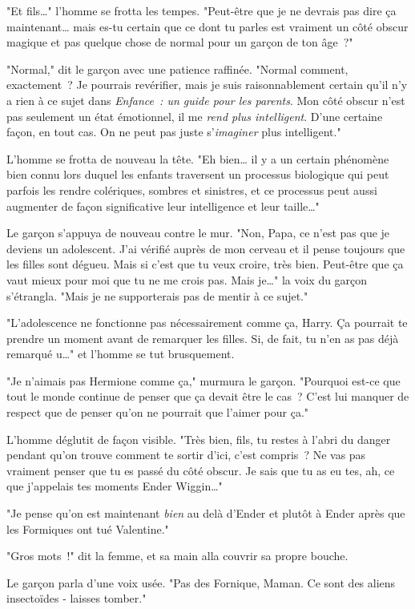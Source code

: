"Et fils…" l'homme se frotta les tempes. "Peut-être que je ne devrais pas dire ça maintenant… mais es-tu certain que ce dont tu parles est vraiment un côté obscur magique et pas quelque chose de normal pour un garçon de ton âge~?"

"Normal," dit le garçon avec une patience raffinée. "Normal comment, exactement~? Je pourrais revérifier, mais je suis raisonnablement certain qu'il n'y a rien à ce sujet dans \emph{Enfance~: un guide pour les parents}. Mon côté obscur n'est pas seulement un état émotionnel, il me \emph{rend plus intelligent}. D'une certaine façon, en tout cas. On ne peut pas juste s'\emph{imaginer} plus intelligent."

L'homme se frotta de nouveau la tête. "Eh bien… il y a un certain phénomène bien connu lors duquel les enfants traversent un processus biologique qui peut parfois les rendre colériques, sombres et sinistres, et ce processus peut aussi augmenter de façon significative leur intelligence et leur taille…"

Le garçon s'appuya de nouveau contre le mur. "Non, Papa, ce n'est pas que je deviens un adolescent. J'ai vérifié auprès de mon cerveau et il pense toujours que les filles sont dégueu. Mais si c'est que tu veux croire, très bien. Peut-être que ça vaut mieux pour moi que tu ne me crois pas. Mais je…" la voix du garçon s'étrangla. "Mais je ne supporterais pas de mentir à ce sujet."

"L'adolescence ne fonctionne pas nécessairement comme ça, Harry. Ça pourrait te prendre un moment avant de remarquer les filles. Si, de fait, tu n'en as pas déjà remarqué u…" et l'homme se tut brusquement.

"Je n'aimais pas Hermione comme ça," murmura le garçon. "Pourquoi est-ce que tout le monde continue de penser que ça devait être le cas~? C'est lui manquer de respect que de penser qu'on ne pourrait que l'aimer pour ça."

L'homme déglutit de façon visible. "Très bien, fils, tu restes à l'abri du danger pendant qu'on trouve comment te sortir d'ici, c'est compris~? Ne vas pas vraiment penser que tu es passé du côté obscur. Je sais que tu as eu tes, ah, ce que j'appelais tes moments Ender Wiggin…"

"Je pense qu'on est maintenant \emph{bien} au delà d'Ender et plutôt à Ender après que les Formiques ont tué Valentine."

"Gros mots~!" dit la femme, et sa main alla couvrir sa propre bouche.

Le garçon parla d'une voix usée. "Pas des Fornique, Maman. Ce sont des aliens insectoïdes - laisses tomber."

